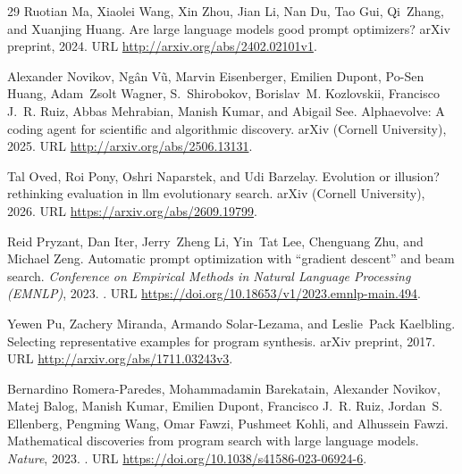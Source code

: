 \documentclass[10pt]{article}
\begin{document}
\begin{thebibliography}{29}
Ruotian Ma, Xiaolei Wang, Xin Zhou, Jian Li, Nan Du, Tao Gui, Qi~Zhang, and
  Xuanjing Huang.
\newblock Are large language models good prompt optimizers?
\newblock arXiv preprint, 2024.
\newblock URL \url{http://arxiv.org/abs/2402.02101v1}.

Alexander Novikov, Ng\^{a}n V\~{u}, Marvin Eisenberger, Emilien Dupont, Po-Sen Huang,
  Adam~Zsolt Wagner, S.~Shirobokov, Borislav~M. Kozlovskii, Francisco J.~R.
  Ruiz, Abbas Mehrabian, Manish Kumar, and Abigail See.
\newblock Alphaevolve: A coding agent for scientific and algorithmic discovery.
\newblock arXiv (Cornell University), 2025.
\newblock URL \url{http://arxiv.org/abs/2506.13131}.

Tal Oved, Roi Pony, Oshri Naparstek, and Udi Barzelay.
\newblock Evolution or illusion? rethinking evaluation in llm evolutionary
  search.
\newblock arXiv (Cornell University), 2026.
\newblock URL \url{https://arxiv.org/abs/2609.19799}.

Reid Pryzant, Dan Iter, Jerry~Zheng Li, Yin~Tat Lee, Chenguang Zhu, and Michael
  Zeng.
\newblock Automatic prompt optimization with ``gradient descent'' and beam
  search.
\newblock \emph{Conference on Empirical Methods in Natural Language Processing
  (EMNLP)}, 2023.
\newblock {}.
\newblock URL \url{https://doi.org/10.18653/v1/2023.emnlp-main.494}.

Yewen Pu, Zachery Miranda, Armando Solar-Lezama, and Leslie~Pack Kaelbling.
\newblock Selecting representative examples for program synthesis.
\newblock arXiv preprint, 2017.
\newblock URL \url{http://arxiv.org/abs/1711.03243v3}.

Bernardino Romera-Paredes, Mohammadamin Barekatain, Alexander Novikov, Matej
  Balog, Manish Kumar, Emilien Dupont, Francisco J.~R. Ruiz, Jordan~S.
  Ellenberg, Pengming Wang, Omar Fawzi, Pushmeet Kohli, and Alhussein Fawzi.
\newblock Mathematical discoveries from program search with large language
  models.
\newblock \emph{Nature}, 2023.
\newblock {}.
\newblock URL \url{https://doi.org/10.1038/s41586-023-06924-6}.


\end{thebibliography}
\end{document}
